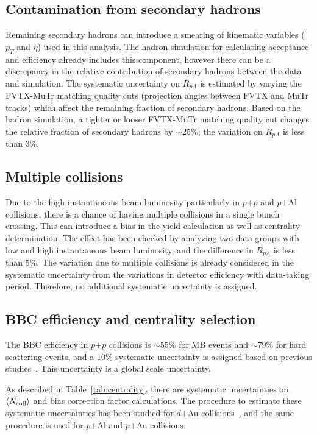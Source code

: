 \documentclass[twocolumn,letterpaper,aps,prc,longbibliography,superscriptaddress,nofootinbib,floatfix]{revtex4-2}
\newcommand{\pt}{\mbox{$p_T$}\xspace}
\newcommand{\rpa}{\mbox{$R_{pA}$}\xspace}
\newcommand{\ncoll}{\mbox{$\langle N_{\rm coll} \rangle$}\xspace}
\newcommand{\pp}{\mbox{$p$+$p$}\xspace}
\newcommand{\dau}{\mbox{$d$$+$Au}\xspace}
\newcommand{\pau}{\mbox{$p$$+$Au}\xspace}
\newcommand{\pal}{\mbox{$p$$+$Al}\xspace}
\begin{document}
\subsection{Contamination from secondary hadrons}

Remaining secondary hadrons can introduce a smearing of kinematic 
variables (\pt and $\eta$) used in this analysis. The hadron simulation 
for calculating acceptance and efficiency already includes this 
component, however there can be a discrepancy in the relative 
contribution of secondary hadrons between the data and simulation. The 
systematic uncertainty on \rpa is estimated by varying the FVTX-MuTr 
matching quality cuts (projection angles between FVTX and MuTr tracks) 
which affect the remaining fraction of secondary hadrons. Based on the 
hadron simulation, a tighter or looser FVTX-MuTr matching quality cut 
changes the relative fraction of secondary hadrons by $\sim25\%$; the 
variation on \rpa is less than 3\%.

\subsection{Multiple collisions}

Due to the high instantaneous beam luminosity particularly in \pp and 
\pal collisions, there is a chance of having multiple collisions in a 
single bunch crossing. This can introduce a bias in the yield 
calculation as well as centrality determination. The effect has been 
checked by analyzing two data groups with low and high instantaneous 
beam luminosity, and the difference in \rpa is less than 5\%. The 
variation due to multiple collisions is already considered in the 
systematic uncertainty from the variations in detector efficiency with 
data-taking period. Therefore, no additional systematic uncertainty is 
assigned.

\subsection{BBC efficiency and centrality selection}

The BBC efficiency in \pp collisions is $\sim55\%$ for MB events and 
$\sim79\%$ for hard scattering events, and a 10\% systematic uncertainty 
is assigned based on previous studies~\cite{Adler:2003pb}.  This 
uncertainty is a global scale uncertainty.

As described in Table~\ref{tab:centrality}, there are systematic 
uncertainties on \ncoll and bias correction factor calculations. The 
procedure to estimate these systematic uncertainties has been studied 
for \dau collisions~\cite{Adare:2013nff}, and the same procedure is used 
for \pal and \pau collisions.
\end{document}
